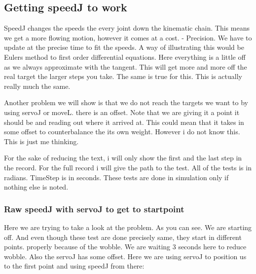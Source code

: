 \subsection{Getting speedJ to work}
SpeedJ changes the speeds the every joint down the kinematic chain. This means we get a more flowing motion, however it comes at a cost. - Precision. 
\newline We have to update at the precise time to fit the speeds.
\newline A way of illustrating this would be Eulers method to first order differential equations. 
\newline Here everything is a little off as we always approximate with the tangent. This will get more and more off the real target the larger steps you take. 
\newline The same is true for this. This is actually really much the same.\newline

Another problem we will show is that we do not reach the targets we want to by using servoJ or moveL. there is an offset. Note that we are giving it a point it should be and reading out where it arrived at.
\newline This could mean that it takes in some offset to counterbalance the its own weight. However i do not know this. This is just me thinking.\newline

For the sake of reducing the text, i will only show the first and the last step in the record. For the full record i will give the path to the test.
\newline All of the tests is in radians. TimeStep is in seconds.
\newline These tests are done in simulation only if nothing else is noted.
\subsubsection{Raw speedJ with servoJ to get to startpoint}
Here we are trying to take a look at the problem. 
\newline As you can see. We are starting off. And even though these test are done precisely same, they start in different points. properly because of the wobble. We are waiting 3 seconds here to reduce wobble.
\newline Also the servoJ has some offset. 
\newline Here we are using servoJ to position us to the first point and using speedJ from there:

